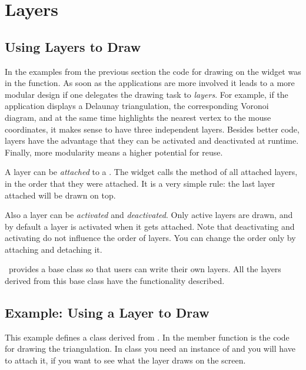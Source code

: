 \section{Layers}
\label{Qt_widget_layers}
\subsection{Using Layers to Draw}

In the examples from the previous section the code for drawing on the
widget was in the  function. As soon as the
applications are more involved it leads to a more modular design if
one delegates the drawing task to {\em layers}. For example, if the
application displays a Delaunay triangulation, the corresponding
Voronoi diagram, and at the same time highlights the nearest vertex to
the mouse coordinates, it makes sense to have three independent
layers. Besides better code, layers have the advantage that they can
be activated and deactivated at runtime. Finally, more modularity
means a higher potential for reuse.

A layer can be {\em attached} to a . The widget calls
the method  of all attached layers, in the
order that they were attached. It is a very simple rule: the last layer
attached will be drawn on top.

Also a layer can be {\em activated} and {\em deactivated}. Only active
layers are drawn, and by default a layer is activated when it gets
attached.  Note that deactivating and activating do not influence the
order of layers. You can change the order only by attaching and
detaching it.


\cgal\ provides a base class so that users can write their own
layers. All the layers derived from this base class
 have the functionality described.


\subsection{Example: Using a Layer to Draw}

This example defines a class derived from
. In the member function 
is the code for drawing the triangulation. In 
class you need an instance of  and you will 
have to attach it, if you want to see what the layer draws on the
screen.


